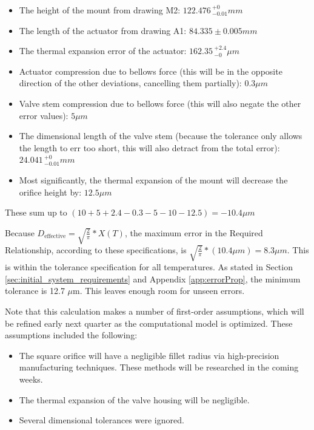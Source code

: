 \documentclass[12pt, letterpaper]{report}%
\begin{document}
        \begin{itemize}
            \item The height of the mount from drawing M2: $122.476\,{}^{+0}_{-0.01} mm$
            \item The length of the actuator from drawing A1: $84.335 \pm 0.005mm$
            \item The thermal expansion error of the actuator: $162.35\,{}^{+2.4}_{-0} \mu m$
            \item Actuator compression due to bellows force (this will be in the opposite direction of the other deviations, cancelling them partially): $0.3 \mu m$
            \item Valve stem compression due to bellows force (this will also negate the other error values): $5 \mu m$
            \item The dimensional length of the valve stem (because the tolerance only allows the length to err too short, this will also detract from the total error): $24.041\,{}^{+0}_{-0.01} mm$
            \item Most significantly, the thermal expansion of the mount will decrease the orifice height by: $12.5 \mu m$
        \end{itemize}

        These sum up to 
        $(10 + 5 + 2.4 - 0.3 - 5 - 10 - 12.5) = -10.4 \mu m$

        Because $D_{\text{effective}} = \sqrt{\frac{2}{\pi}}*X(T)$, the maximum error in the Required Relationship, according to these specifications, is
        $\sqrt{\frac{2}{\pi}}*(10.4 \mu m) = 8.3 \mu m$. This is within the tolerance specification for all temperatures.
        As stated in Section \ref{sec:initial_system_requirements} and Appendix \ref{app:errorProp}, the minimum tolerance is 12.7 $\mu$m.
        This leaves enough room for unseen errors.

        Note that this calculation makes a number of first-order assumptions, which will be refined early next quarter as the computational model is optimized.
        These assumptions included the following:

        \begin{itemize}
            \item The square orifice will have a negligible fillet radius via high-precision manufacturing techniques. These methods will be researched in the coming weeks.
            \item The thermal expansion of the valve housing will be negligible.
            \item Several dimensional tolerances were ignored.
        \end{itemize}
\end{document}
